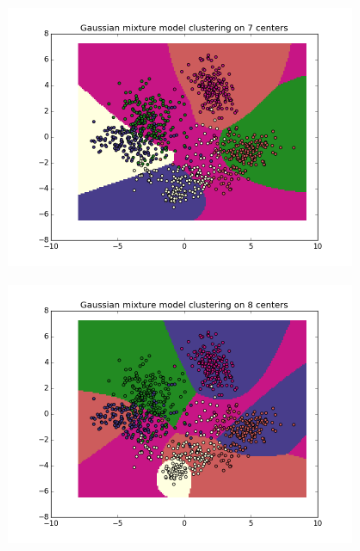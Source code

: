 \documentclass{article}
\begin{document}
\begin{center}
\begin{figure}
\centering
        \begin{subfigure}[b]{0.48\textwidth}
                \centering
                \includegraphics[width=\linewidth]{figure_15}
        \end{subfigure}\hfill
        \begin{subfigure}[b]{0.48\textwidth}
                \centering
                \includegraphics[width=\linewidth]{figure_16}
        \end{subfigure}\hfill
        \label{fig:8}
 \end{figure}
       

\end{center}
\end{document}
